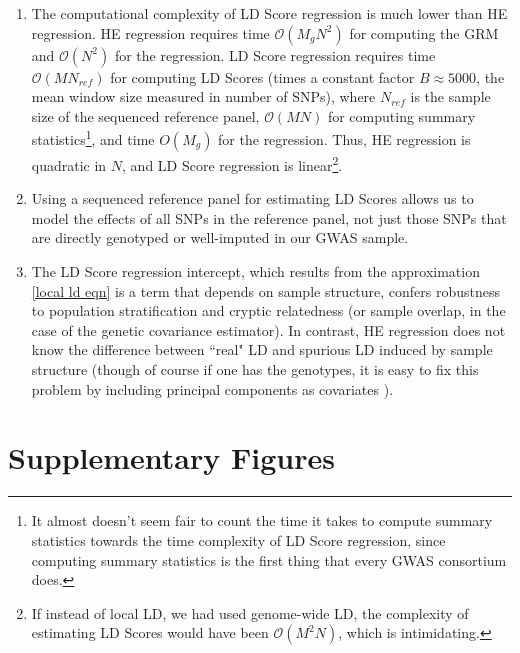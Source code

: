 \documentclass[11pt]{article}
\numberwithin{equation}{section}
\numberwithin{definition}{section}
\numberwithin{thm}{section}
\numberwithin{lemma}{section}
\numberwithin{prop}{section}
\numberwithin{cor}{section}
\numberwithin{hyp}{section}
\begin{document}
\begin{enumerate}
	\item The computational complexity of LD Score regression is much lower than HE regression. HE regression requires time
	$\mathscr{O}(M_gN^2)$ for computing the GRM and $\mathscr{O}(N^2)$ for the regression. LD Score regression requires
	time $\mathscr{O}(MN_{ref})$ for computing LD Scores (times a constant factor $B\approx 5000$,
	the mean window size measured in number of SNPs), where $N_{ref}$ is the sample size of the sequenced reference panel,
	$\mathscr{O}(MN)$ for computing summary statistics\footnote{It almost doesn't seem fair to count the time it takes to compute summary statistics towards the time complexity of LD Score regression, since computing summary statistics is the first thing that every GWAS consortium does.},
	 and time $O(M_g)$ for the regression. 
	Thus, HE regression is quadratic in $N$, and LD Score regression is linear\footnote{If instead of local LD, we had used 
	genome-wide LD, the complexity of estimating LD Scores would have been $\mathscr{O}(M^2N)$, which is intimidating.}. 
	
	\item Using a sequenced reference panel for estimating LD Scores allows us to model the effects of all SNPs in the reference panel,
	not just those SNPs that are directly genotyped or well-imputed in our GWAS sample.
	
	\item The LD Score regression intercept, which results from the approximation \ref{local ld eqn} is a term that depends on sample structure, 
	confers robustness to population stratification and cryptic relatedness (or sample
	overlap, in the case of the genetic covariance estimator). In contrast, HE regression does not know the difference between ``real" 
	LD and spurious LD induced by sample structure (though of course if one has the genotypes, it is easy to fix this problem by including
	principal components as covariates \cite{price2006principal}).
 	
\end{enumerate}


\newpage
\section{Supplementary Figures}
\end{document}
